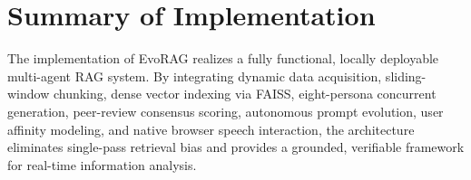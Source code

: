 \section{Summary of Implementation}
\label{sec:impl_summary}
The implementation of EvoRAG realizes a fully functional, locally deployable multi-agent RAG system. By integrating dynamic data acquisition, sliding-window chunking, dense vector indexing via FAISS, eight-persona concurrent generation, peer-review consensus scoring, autonomous prompt evolution, user affinity modeling, and native browser speech interaction, the architecture eliminates single-pass retrieval bias and provides a grounded, verifiable framework for real-time information analysis.
